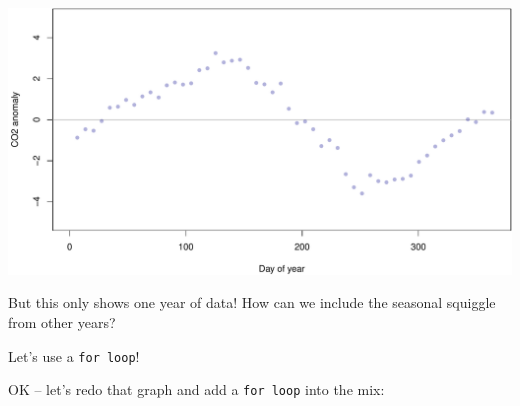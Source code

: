 \documentclass[
]{book}
\newenvironment{Shaded}{\begin{snugshade}}{\end{snugshade}}
\newcommand{\AttributeTok}[1]{\textcolor[rgb]{0.77,0.63,0.00}{#1}}
\newcommand{\CommentTok}[1]{\textcolor[rgb]{0.56,0.35,0.01}{\textit{#1}}}
\newcommand{\DecValTok}[1]{\textcolor[rgb]{0.00,0.00,0.81}{#1}}
\newcommand{\FunctionTok}[1]{\textcolor[rgb]{0.00,0.00,0.00}{#1}}
\newcommand{\NormalTok}[1]{#1}
\newcommand{\SpecialCharTok}[1]{\textcolor[rgb]{0.00,0.00,0.00}{#1}}
\newcommand{\StringTok}[1]{\textcolor[rgb]{0.31,0.60,0.02}{#1}}
\begin{document}
\begin{Shaded}
\end{Shaded}

\includegraphics{figures/unnamed-chunk-313-1.pdf}

But this only shows one year of data! How can we include the seasonal squiggle from other years?

Let's use a \texttt{for\ loop}!

OK -- let's redo that graph and add a \texttt{for\ loop} into the mix:
\end{document}
